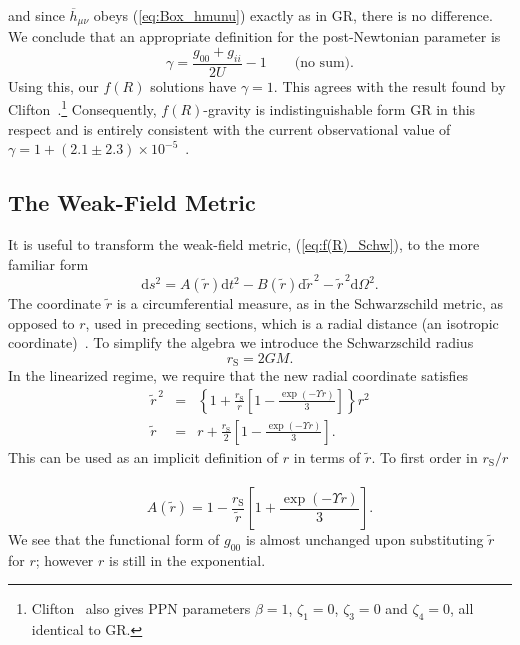 \documentclass[aps,prd,amsfonts,amssymb,amsmath,nofootinbib,reprint,showpacs]{revtex4-1}
\newcommand{\eqnref}[1]{(\ref{eq:#1})}
\newcommand{\sub}[1]{\ensuremath{_\text{#1}}}
\newcommand{\dd}{\ensuremath{\text{d}}}
\begin{document}
and since $\overline{h}_{\mu\nu}$ obeys \eqnref{Box_hmunu} exactly as in GR, there is no difference. We conclude that an appropriate definition for the post-Newtonian parameter is
\begin{equation}
\gamma = \frac{g_{00} + g_{ii}}{2U} - 1 \qquad \text{(no sum)}.
\end{equation}
Using this, our $f(R)$ solutions have $\gamma = 1$. This agrees with the result found by Clifton~\cite{Clifton2008}.\footnote{Clifton~\cite{Clifton2008} also gives PPN parameters $\beta =1$, $\zeta_1 = 0$, $\zeta_3 = 0$ and $\zeta_4 = 0$, all identical to GR.} Consequently, $f(R)$-gravity is indistinguishable form GR in this respect and is entirely consistent with the current observational value of $\gamma = 1 + (2.1 \pm 2.3) \times 10^{-5}$~\cite{Will2006, Bertotti2003}.

\subsection{The Weak-Field Metric}

It is useful to transform the weak-field metric, \eqnref{f(R)_Schw}, to the more familiar form
\begin{equation}
\dd s^2 = A(\widetilde{r}) \dd t^2 - B(\widetilde{r})\dd \widetilde{r}^{\,2} - \widetilde{r}^{\,2} \dd \Omega^2.
\label{eq:Sph_sym}
\end{equation}
The coordinate $\widetilde{r}$ is a circumferential measure, as in the Schwarzschild metric, as opposed to $r$, used in preceding sections, which is a radial distance (an isotropic coordinate)~\cite{Misner1973, Olmo2007c}. To simplify the algebra we introduce the Schwarzschild radius
\begin{equation}
r\sub{S} = 2GM.
\end{equation}
In the linearized regime, we require that the new radial coordinate satisfies
\begin{eqnarray}
\widetilde{r}^{\,2} & = & \left\{1 + \frac{r\sub{S}}{r}\left[1 - \frac{\exp(-\Upsilon r)}{3}\right]\right\}r^2 \\
\widetilde{r} & = & r + \frac{r\sub{S}}{2}\left[1 - \frac{\exp(-\Upsilon r)}{3}\right].
\label{eq:r_tilde}
\end{eqnarray}
This can be used as an implicit definition of $r$ in terms of $\widetilde{r}$. To first order in ${r\sub{S}}/{r}$~\cite{Olmo2007c}
\begin{equation}
A(\widetilde{r}) = 1 - \frac{r\sub{S}}{\widetilde{r}}\left[1 + \frac{\exp(-\Upsilon r )}{3}\right].
\label{eq:A_metric}
\end{equation}
We see that the functional form of $g_{00}$ is almost unchanged upon substituting $\widetilde{r}$ for $r$; however $r$ is still in the exponential.
\end{document}
